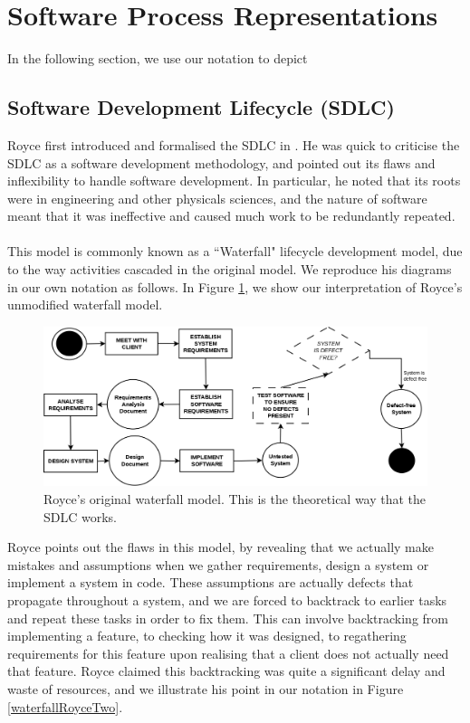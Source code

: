 \section{Software Process Representations} \label{diagrams}

In the following section, we use our notation to depict 

\subsection{Software Development Lifecycle (SDLC)}
Royce first introduced and formalised the SDLC in
\cite{Royce:1987:MDL:41765.41801}.
He was quick to criticise the SDLC as a software development methodology, and pointed out its flaws
and inflexibility to handle software development.
In particular, he noted that its roots were in engineering and other physicals sciences, and the
nature of software meant that it was ineffective and caused much work to be redundantly repeated.\\
\\
This model is commonly known as a ``Waterfall" lifecycle development model, due to the way
activities cascaded in the original model.
We reproduce his diagrams in our own notation as follows.
In Figure \ref{waterfallRoyceOne}, we show our interpretation of Royce's unmodified waterfall model.

\begin{figure}[ht!]
	\includegraphics[scale=0.3]{media/WaterfallRoyceOne}
	\caption{Royce's original waterfall model. This is the theoretical way that the SDLC works.}
	\label{waterfallRoyceOne}
\end{figure}

Royce points out the flaws in this model, by revealing that we actually make mistakes and
assumptions when we gather requirements, design a system or implement a system in code.
These assumptions are actually defects that propagate throughout a system, and we are forced to
backtrack to earlier tasks and repeat these tasks in order to fix them.
This can involve backtracking from implementing a feature, to checking how it was designed, to
regathering requirements for this feature upon realising that a client does not actually need that
feature.
Royce claimed this backtracking was quite a significant delay and waste of resources, and we
illustrate his point in our notation in Figure \ref{waterfallRoyceTwo}.


